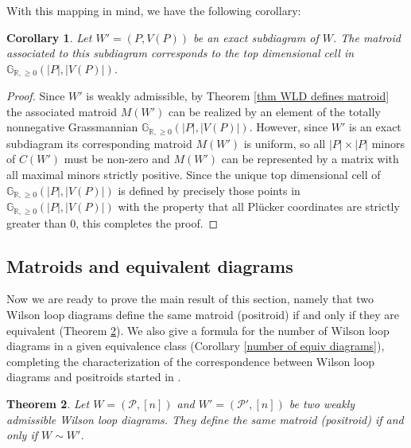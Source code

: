 \documentclass[11pt]{article}
\newcommand{\R}{\mathbb{R}}
\newcommand{\Gr}{\mathbb{G}_{\R, \geq 0}}
\newcommand{\cP}{\mathcal{P}}
\newtheorem{thm}{Theorem}[section]
\newtheorem{cor}[thm]{Corollary}
\theoremstyle{remark}
\theoremstyle{definition}
\begin{document}
With this mapping in mind, we have the following corollary:

\begin{cor}
Let $W' = (P, V(P))$ be an exact subdiagram of $W$. The matroid associated to this subdiagram corresponds to the top dimensional cell in $\Gr(|P|, |V(P)|)$.
\end{cor}

\begin{proof}
Since $W'$ is weakly admissible, by Theorem \ref{thm WLD defines matroid} the associated matroid $M(W')$ can be realized by an element of the totally nonnegative Grassmannian $\Gr(|P|,|V(P)|)$. However, since $W'$ is an exact subdiagram its corresponding matroid $M(W')$ is uniform, so all $|P| \times |P|$ minors of $C(W')$ must be non-zero and $M(W')$ can be represented by a matrix with all maximal minors strictly positive. Since the unique top dimensional cell of $\Gr(|P|, |V(P)|)$ is defined by precisely those points in $\Gr(|P|, |V(P)|)$ with the property that all Pl\"ucker coordinates are strictly greater than $0$, this completes the proof.
\end{proof}


\subsection{Matroids and equivalent diagrams \label{sec: matroids and equivalence}}

Now we are ready to prove the main result of this section, namely that two Wilson loop diagrams define the same matroid (positroid) if and only if they are equivalent (Theorem \ref{same matroid iff equiv}). We also give a formula for the number of Wilson loop diagrams in a given equivalence class (Corollary \ref{number of equiv diagrams}), completing the characterization of the correspondence between Wilson loop diagrams and positroids started in \cite{wilsonloop}.

\begin{thm}\label{same matroid iff equiv}
Let $W= (\cP, [n])$ and $W'= (\cP', [n])$ be two weakly admissible Wilson loop diagrams. They define the same matroid (positroid) if and only if $W \sim W'$.
\end{thm}
\end{document}
